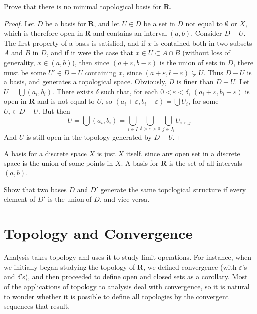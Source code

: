 \begin{exercise}
    Prove that there is no minimal topological basis for $\mathbf{R}$.
\end{exercise}
\begin{proof}
    Let $D$ be a basis for $\mathbf{R}$, and let $U \in D$ be a set in $D$ not equal to $\emptyset$ or $X$, which is therefore open in $\mathbf{R}$ and contains an interval $(a,b)$. Consider $D - U$. The first property of a basis is satisfied, and if $x$ is contained both in two subsets $A$ and $B$ in $D$, and if it were the case that $x \in U \subset A \cap B$ (without loss of generality, $x \in (a,b)$), then since $(a + \varepsilon,b - \varepsilon)$ is the union of sets in $D$, there must be some $U' \in D - U$ containing $x$, since $(a + \varepsilon, b - \varepsilon) \subsetneq U$. Thus $D - U$ is a basis, and generates a topological space. Obviously, $D$ is finer than $D -U$. Let $U = \bigcup (a_i, b_i)$. There exists $\delta$ such that, for each $0 < \varepsilon < \delta$, $(a_i + \varepsilon, b_i - \varepsilon)$ is open in $\mathbf{R}$ and is not equal to $U$, so $(a_i + \varepsilon, b_i - \varepsilon) = \bigcup U_i$, for some $U_i \in D - U$. But then
    \[ U = \bigcup (a_i, b_i) = \bigcup_{i \in I} \bigcup_{\delta > \varepsilon > 0} \bigcup_{j \in J_i} U_{i,\varepsilon,j} \]
    And $U$ is still open in the topology generated by $D - U$.
\end{proof}

A basis for a discrete space $X$ is just $X$ itself, since any open set in a discrete space is the union of some points in $X$. A basis for $\mathbf{R}$ is the set of all intervals $(a,b)$.

\begin{exercise}
    Show that two bases $D$ and $D'$ generate the same topological structure if every element of $D'$ is the union of $D$, and vice versa.
\end{exercise}

\section{Topology and Convergence}

Analysis takes topology and uses it to study limit operations. For instance, when we initially began studying the topology of $\mathbf{R}$, we defined convergence (with $\varepsilon$'s and $\delta$'s), and then proceeded to define open and closed sets as a corollary. Most of the applications of topology to analysis deal with convergence, so it is natural to wonder whether it is possible to define all topologies by the convergent sequences that result.

